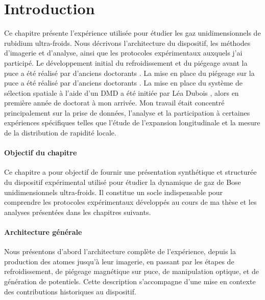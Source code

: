 \section*{Introduction}


Ce chapitre présente l’expérience utilisée pour étudier les gaz unidimensionnels de rubidium ultra-froids. Nous décrivons l’architecture du dispositif, les méthodes d’imagerie et d’analyse, ainsi que les protocoles expérimentaux auxquels j’ai participé. Le développement initial du refroidissement et du piégeage avant la puce a été réalisé par d’anciens doctorants \cite{jacqm2012,Fang2014,Johnson2016} . La mise en place du piégeage sur la puce a été réalisé par d’anciens doctorants \cite{jacqm2012,Fang2014,Johnson2016,schem2019,L.Dubois2024}. La mise en place du système de sélection spatiale à l’aide d’un \gls{DMD}  a été initiée par Léa Dubois \cite{L.Dubois2024}, alors en première année de doctorat à mon arrivée. Mon travail était concentré principalement sur la prise de données, l’analyse et la participation à certaines expériences spécifiques telles que l'étude de l’expansion longitudinale et la mesure de la distribution de rapidité locale.



\paragraph{Objectif du chapitre}  
Ce chapitre a pour objectif de fournir une présentation synthétique et structurée du dispositif expérimental utilisé pour étudier la dynamique de gaz de Bose unidimensionnels ultra-froids. Il constitue un socle indispensable pour comprendre les protocoles expérimentaux développés au cours de ma thèse et les analyses présentées dans les chapitres suivants.

\paragraph{Architecture générale}  
Nous présentons d'abord l’architecture complète de l’expérience, depuis la production des atomes jusqu’à leur imagerie, en passant par les étapes de refroidissement, de piégeage magnétique sur puce, de manipulation optique, et de génération de potentiels. Cette description s’accompagne d’une mise en contexte des contributions historiques au dispositif.

